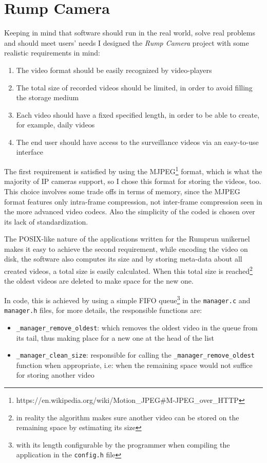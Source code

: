 \documentclass[10pt,a4paper,twoside]{article}
\begin{document}
\section{Rump Camera}
Keeping in mind that software should run in the real world, solve real problems and should meet users' needs I designed the \textit{Rump Camera} project with some realistic requirements in mind:

\begin{enumerate}
\item The video format should be easily recognized by video-players
\item The total size of recorded videos should be limited, in order to avoid filling the storage medium
\item Each video should have a fixed specified length, in order to be able to create, for example, daily videos
\item The end user should have access to the surveillance videos via an easy-to-use interface
\end{enumerate}

The first requirement is satisfied by using the MJPEG\footnote{https://en.wikipedia.org/wiki/Motion\_JPEG\#M-JPEG\_over\_HTTP} format, which is what the majority of IP cameras support, so I chose this format
for storing the videos, too. This choice involves some trade offs in terms of memory,
since the MJPEG format features only intra-frame compression, not inter-frame compression seen
in the more advanced video codecs. Also the simplicity of the coded is chosen over its lack of standardization.

The POSIX-like nature of the applications written for the Rumprun unikernel makes it
easy to achieve the second requirement, while encoding the video on disk, the software also computes its
size and by storing meta-data about all created videos, a total size is easily calculated.
When this total size is reached\footnote{in reality the algorithm makes sure another video can be stored on
the remaining space by estimating its size} the oldest videos are deleted to make space for the new one.

In code, this is achieved by using a simple FIFO queue\footnote{with its length configurable by the programmer when compiling the application in the \texttt{config.h} file} in the
\texttt{manager.c} and \texttt{manager.h} files, for more details, the responsible functions are:

\begin{itemize}
\item \texttt{\_manager\_remove\_oldest}: which removes the oldest video in the queue from its tail,
thus making place for a new one at the head of the list
\item \texttt{\_manager\_clean\_size}: responsible for calling the \texttt{\_manager\_remove\_oldest} function
when appropriate, i.e: when the remaining space would not suffice for storing another video
\end{itemize}
\end{document}
